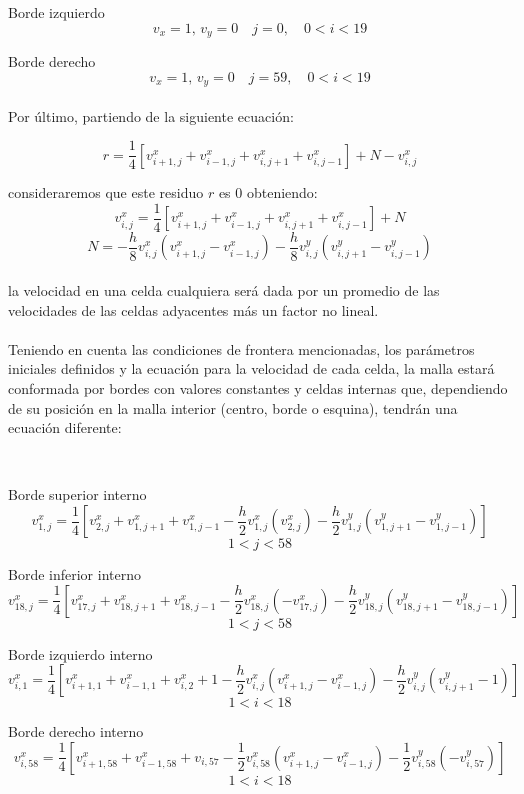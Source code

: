 \documentclass{article}
\begin{document}
  Borde izquierdo
  \[v_x = 1, \, v_y = 0 \quad j = 0, \quad 0 < i < 19\]

  Borde derecho
  \[v_x = 1, \, v_y = 0 \quad j = 59, \quad 0 < i < 19\]

  \paragraph{}
  Por último, partiendo de la siguiente ecuación:

  \[r=\frac{1}{4}[v_{i+1,j}^x+v_{i-1,j}^x+v_{i,j+1}^x+v_{i,j-1}^x]+N-v_{i,j}^x\]
  
  consideraremos que este residuo $r$ es $0$ obteniendo:
  \[v_{i,j}^x=\frac{1}{4}[v_{i+1,j}^x+v_{i-1,j}^x+v_{i,j+1}^x+v_{i,j-1}^x]+N\]
  \[N=-\frac{h}{8}v_{i,j}^x(v_{i+1,j}^x-v_{i-1,j}^x)-\frac{h}{8}v_{i,j}^y(v_{i,j+1}^y-v_{i,j-1}^y)\]

  \paragraph{}
  la velocidad en una celda cualquiera será dada por un promedio de las velocidades de las celdas adyacentes más un factor no lineal.

  \paragraph{}
  Teniendo en cuenta las condiciones de frontera mencionadas, los parámetros iniciales definidos y la ecuación para la velocidad de cada celda, la malla estará conformada por bordes con valores constantes y celdas internas que, dependiendo de su posición en la malla interior (centro, borde o esquina), tendrán una ecuación diferente:

  \

  Borde superior interno
  \[v^{x}_{1,j} = \frac{1}{4}[v^x_{2,j} + v^x_{1,j+1} + v^x_{1,j-1} - \frac{h}{2}v^{x}_{1,j}(v^x_{2,j})- \frac{h}{2}v^{y}_{1,j}(v^y_{1,j+1}-v^y_{1,j-1})]\]
  \[1<j<58\]

  Borde inferior interno
  \[v^{x}_{18,j} = \frac{1}{4}[v^x_{17,j} + v^x_{18,j+1} + v^x_{18,j-1} - \frac{h}{2}v^{x}_{18,j}(-v^{x}_{17,j})- \frac{h}{2}v^{y}_{18,j}(v^y_{18,j+1}-v^y_{18,j-1})]\]
  \[1<j<58\]

  Borde izquierdo interno
  \[v_{i,1}^x=\frac{1}{4}[v_{i+1,1}^x+v_{i-1,1}^x+v_{i,2}^x+1 - \frac{h}{2}v^{x}_{i,j}(v^{x}_{i+1,j}-v^{x}_{i-1,j})- \frac{h}{2}v^{y}_{i,j}(v^y_{i,j+1}-1)]\]
  \[1<i<18\]

  Borde derecho interno
  \[v_{i,58}^x=\frac{1}{4}[v_{i+1,58}^x+v_{i-1,58}^x+v_{i,57}-\frac{1}{2}v_{i,58}^x(v_{i+1,j}^x-v_{i-1,j}^x)-\frac{1}{2}v_{i,58}^y(-v_{i,57}^y)]\]
  \[1<i<18\]
\end{document}
